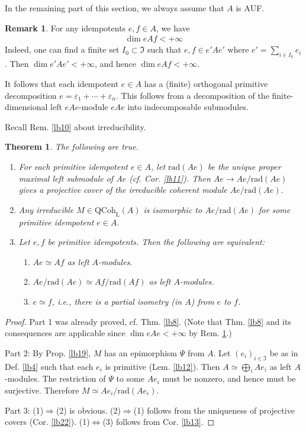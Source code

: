 \documentclass[11pt,b5paper,notitlepage]{article}
\theoremstyle{definition}
\newtheorem{rem}[df]{Remark}
\theoremstyle{plain}
\newtheorem{thm}[df]{Theorem}
\newcommand{\fk}{\mathfrak}
\newcommand{\eps}{\varepsilon}
\newcommand{\QC}{\mathrm{QCoh}_{\mathrm L}}
\newcommand{\rad}{\mathrm{rad}}
\numberwithin{equation}{section}
\begin{document}
In the remaining part of this section, we always assume that $A$ is AUF.


\begin{rem}\label{lb14}
For any idempotents $e,f\in A$, we have
\begin{align*}
\dim eAf<+\infty
\end{align*}
Indeed, one can find a finite set $I_0\subset \fk I$ such that $e,f\in e'Ae'$ where $e'=\sum_{i\in I_0}e_i$. Then $\dim e'Ae'<+\infty$, and hence $\dim eAf<+\infty$.

It follows that each idempotent $e\in A$ has a (finite) orthogonal primitive decomposition $e=\eps_1+\cdots+\eps_n$. This follows from a decomposition of the finite-dimensional left $eAe$-module $eAe$ into indecomposable submodules.   \hfill\qedsymbol
\end{rem}








Recall Rem. \ref{lb10} about irreducibility.


\begin{thm}\label{lb15}
The following are true.
\begin{enumerate}
\item For each primitive idempotent $e\in A$, let $\rad(Ae)$ be the unique proper maximal left submodule of $Ae$ (cf. Cor. \ref{lb11}). Then $Ae\rightarrow Ae/\rad(Ae)$ gives a projective cover of the irreducible coherent module $Ae/\rad(Ae)$.
\item Any irreducible $M\in\QC(A)$ is isomorphic to $Ae/\rad(Ae)$ for some primitive idempotent $e\in A$.
\item Let $e,f$ be primitive idempotents. Then the following are equivalent:
\begin{enumerate}[label=(\arabic*)]
\item $Ae\simeq Af$ as left $A$-modules.
\item $Ae/\rad(Ae)\simeq Af/\rad(Af)$ as left $A$-modules.
\item $e\simeq f$, i.e., there is a partial isometry (in $A$) from $e$ to $f$. 
\end{enumerate}
\end{enumerate} 
\end{thm}



\begin{proof}
Part 1 was already proved, cf. Thm. \ref{lb8}. (Note that Thm. \ref{lb8} and its consequences are applicable since $\dim eAe<+\infty$ by Rem. \ref{lb14}.)

Part 2: By Prop. \ref{lb19}, $M$ has an epimorphism $\Psi$ from $A$. Let $(e_i)_{i\in\fk I}$ be as in Def. \ref{lb4} such that each $e_i$ is primitive (Lem. \ref{lb12}). Then $A\simeq\bigoplus_i Ae_i$ as left $A$-modules. The restriction of $\Psi$ to some $Ae_i$ must be nonzero, and hence must be surjective. Therefore $M\simeq Ae_i/\rad(Ae_i)$.

Part 3: (1)$\Rightarrow$(2) is obvious. (2)$\Rightarrow$(1) follows from the uniqueness of projective covers (Cor. \ref{lb22}). (1)$\Leftrightarrow$(3) follows from Cor. \ref{lb13}.
\end{proof}
\end{document}
